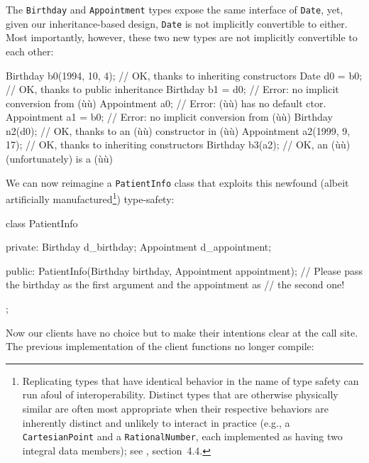 \noindent The \lstinline!Birthday! and \lstinline!Appointment! types expose the same
interface of \lstinline!Date!, yet, given our inheritance-based design,
\lstinline!Date! is not implicitly convertible to either. Most importantly,
however, these two new types are not implicitly convertible to each
other:

\begin{emcppslisting}[language=C++]
Birthday b0(1994, 10, 4);  // OK, thanks to inheriting constructors
Date d0 = b0;              // OK, thanks to public inheritance
Birthday b1 = d0;          // Error: no implicit conversion from (ù{}ù)
Appointment a0;            // Error: (ù{}ù) has no default ctor.
Appointment a1 = b0;       // Error: no implicit conversion from (ù{}ù)
Birthday n2(d0);           // OK, thanks to an (ù{}ù) constructor in (ù{}ù)
Appointment a2(1999, 9, 17); // OK, thanks to inheriting constructors           
Birthday    b3(a2);          // OK, an (ù{}ù) (unfortunately) is a (ù{}ù)
\end{emcppslisting}
    
\noindent We can now reimagine a \lstinline!PatientInfo! class that exploits this
newfound (albeit artificially manufactured{\cprotect\footnote{Replicating
types that have identical behavior in the name of type safety can run
afoul of interoperability. Distinct types that are otherwise
physically similar are often most appropriate when their respective
behaviors are inherently distinct and unlikely to interact in practice
(e.g., a \mbox{\lstinline!CartesianPoint!} and a \mbox{\lstinline!RationalNumber!},
each implemented as having two integral data members); see
  \cite{lakos2a}, section~4.4.}}) type-safety:

\begin{emcppslisting}[language=C++]
class PatientInfo
{
private:
    Birthday d_birthday;
    Appointment d_appointment;

public:
    PatientInfo(Birthday birthday, Appointment appointment);
        // Please pass the birthday as the first argument and the appointment as
        // the second one! 
};
\end{emcppslisting}
    
\noindent Now our clients have no choice but to make their intentions clear at the
call site. The previous implementation of the client functions no longer compile:

